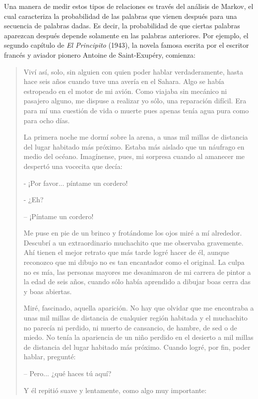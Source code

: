 Una manera de medir estos tipos de relaciones es través del análisis
de Markov, el cual caracteriza la probabilidad de las palabras que vienen
después para una secuencia de palabras dadas.  Es decir, la probabilidad
de que ciertas palabras aparezcan después depende solamente en las palabras
anteriores. Por ejemplo, el segundo capítulo de \emph{El Principito} (1943),
la novela famosa escrita por el escritor francés y aviador pionero 
Antoine de Saint-Exupéry, comienza:
\begin{quote}

Viví así, solo, sin alguien con quien poder hablar verdaderamente,
hasta hace seis años cuando tuve una avería en el Sahara.
Algo se había estropeado en el motor de mi avión. Como viajaba sin mecánico
ni pasajero alguno, me dispuse a realizar yo sólo, una reparación difícil.
Era para mí una cuestión de vida o muerte pues apenas tenía agua pura como para ocho días.

La primera noche me dormí sobre la arena, a unas mil millas de distancia 
del lugar habitado más próximo. Estaba más aislado que un náufrago en medio del océano. 
Imagínense, pues, mi sorpresa cuando al amanecer me despertó una vocecita que decía: 

- ¡Por favor... píntame un cordero!

- ¿Eh?

– ¡Píntame un cordero!

Me puse en pie de un brinco y frotándome los ojos miré a 
mí alrededor. Descubrí a un extraordinario muchachito 
que me observaba gravemente. Ahí tienen el mejor retrato
que más tarde logré hacer de él, aunque reconozco que mi 
dibujo no es tan encantador como el original. La culpa no 
es mía, las personas mayores me desanimaron de mi 
carrera de pintor a la edad de seis años, cuando sólo había 
aprendido a dibujar boas cerra das y boas abiertas. 

Miré, fascinado, aquella aparición. No hay que olvidar que me encontraba a unas
mil millas de distancia de cualquier región habitada y el muchachito no parecía ni 
perdido, ni muerto de cansancio, de hambre, de sed o de miedo. No tenía la apariencia
de un niño perdido en el desierto a mil millas de distancia del lugar habitado más 
próximo. Cuando logré, por fin, poder hablar, pregunté:

– Pero... ¿qué haces tú aquí? 

Y él repitió suave y lentamente, como algo muy importante:


\end{quote}

